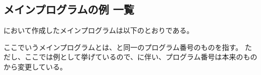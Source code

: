 \setcounter{lstlisting}{0}







\subsection{メインプログラムの例 一覧}
\DMC において作成したメインプログラムは以下のとおりである。
\begin{marker}
ここでいうメインプログラムとは、\DrawingNumber と同一のプログラム番号のものを指す。
ただし、ここでは例として挙げているので、に伴い、プログラム番号は本来のものから変更している。
\end{marker}

